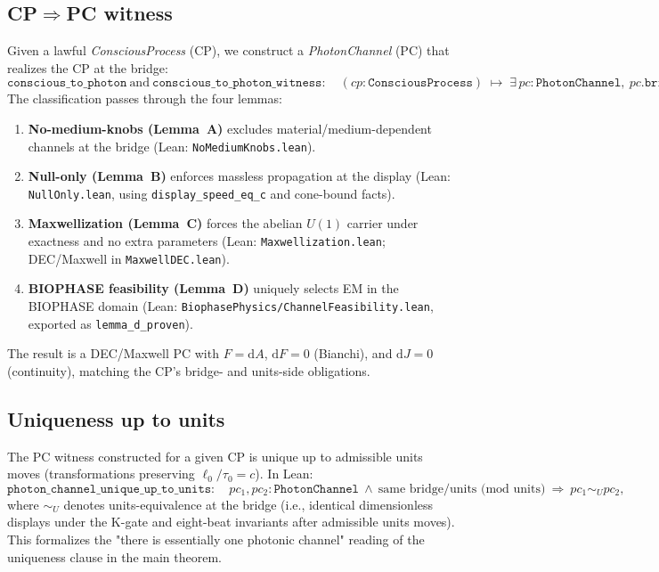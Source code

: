 \documentclass[12pt,a4paper]{article}
\begin{document}
\subsection{CP\texorpdfstring{$\Rightarrow$}{⇒}PC witness}
Given a lawful \emph{ConsciousProcess} (CP), we construct a \emph{PhotonChannel} (PC) that realizes the CP at the bridge:
\[
  \texttt{conscious\_to\_photon} \ \text{and}\ 
  \texttt{conscious\_to\_photon\_witness} :
  \quad
  (cp:\texttt{ConsciousProcess}) \;\mapsto\; \exists\,pc:\texttt{PhotonChannel},\ 
  pc.\texttt{bridge}=cp.\texttt{bridge}\ \wedge\ pc.\texttt{units}=cp.\texttt{units}\ \wedge\ \texttt{WellFormed}(pc).
\]
The classification passes through the four lemmas:
\begin{enumerate}
  \item \textbf{No-medium-knobs (Lemma~A)} excludes material/medium-dependent channels at the bridge (Lean: \texttt{NoMediumKnobs.lean}).
  \item \textbf{Null-only (Lemma~B)} enforces massless propagation at the display (Lean: \texttt{NullOnly.lean}, using \texttt{display\_speed\_eq\_c} and cone-bound facts).
  \item \textbf{Maxwellization (Lemma~C)} forces the abelian \(U(1)\) carrier under exactness and no extra parameters (Lean: \texttt{Maxwellization.lean}; DEC/Maxwell in \texttt{MaxwellDEC.lean}).
  \item \textbf{BIOPHASE feasibility (Lemma~D)} uniquely selects EM in the BIOPHASE domain (Lean: \texttt{BiophasePhysics/ChannelFeasibility.lean}, exported as \texttt{lemma\_d\_proven}).
\end{enumerate}
The result is a DEC/Maxwell PC with \(F=\mathrm{d}A\), \(\mathrm{d}F=0\) (Bianchi), and \(\mathrm{d}J=0\) (continuity), matching the CP's bridge- and units-side obligations.

\subsection{Uniqueness up to units}
The PC witness constructed for a given CP is unique up to admissible units moves (transformations preserving \(\ell_0/\tau_0=c\)). In Lean:
\[
  \texttt{photon\_channel\_unique\_up\_to\_units} :
  \quad
  pc_1,pc_2:\texttt{PhotonChannel}\ \land\ \text{same bridge/units (mod units)}\
  \Rightarrow\ pc_1 \sim_U pc_2,
\]
where \(\sim_U\) denotes units-equivalence at the bridge (i.e., identical dimensionless displays under the K-gate and eight-beat invariants after admissible units moves). This formalizes the "there is essentially one photonic channel" reading of the uniqueness clause in the main theorem.
\end{document}
